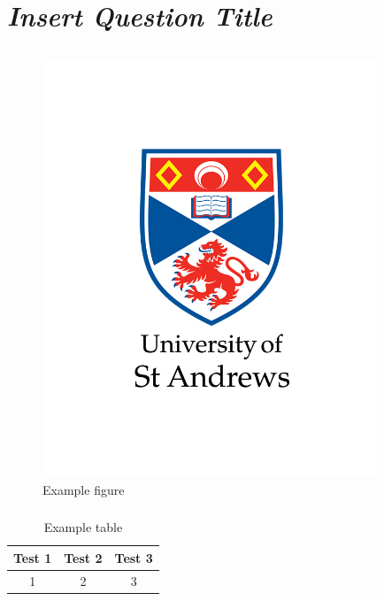 \section{\emph{Insert Question Title}}

\subsection{}

\subsubsection{}

\begin{figure}[H]
\begin{center}
\includegraphics[width=100mm]{images/university-logo.png}
\end{center}
\caption{Example figure}\label{fig:example}
\end{figure}
  

\subsubsection{}

\begin{table}[h]
\centering
\begin{tabular}{|c|c|c|} 
    \hline
    Test 1& Test 2 & Test 3 \\ 
    \hline
    1 & 2 & 3 \\
    \hline
\end{tabular}
\caption{Example table}
\label{table:example}
\end{table}